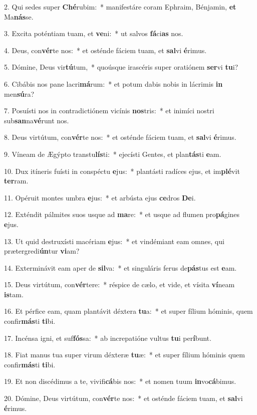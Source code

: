 2. Qui sedes super \textbf{Ché}rubim:~*  manifestáre coram Ephraim, Bénjamin, \textbf{et} Ma\textbf{nás}se.\

3. Excita poténtiam tuam, et \textbf{ve}ni:~*  ut salvos \textbf{fá}ci\textbf{as} nos.\

4. Deus, con\textbf{vér}te nos:~*  et osténde fáciem tuam, et \textbf{sal}vi \textbf{é}rimus.\

5. Dómine, Deus vir\textbf{tú}tum,~*  quoúsque irascéris super oratiónem \textbf{ser}vi \textbf{tu}i?\

6. Cibábis nos pane lacri\textbf{má}rum:~*  et potum dabis nobis in lácrimis \textbf{in} men\textbf{sú}ra?\

7. Posuísti nos in contradictiónem vicínis \textbf{nos}tris:~*  et inimíci nostri sub\textbf{san}na\textbf{vé}runt nos.\

8. Deus virtútum, con\textbf{vér}te nos:~*  et osténde fáciem tuam, et \textbf{sal}vi \textbf{é}rimus.\

9. Víneam de Ægýpto transtu\textbf{lís}ti:~*  ejecísti Gentes, et plan\textbf{tás}ti \textbf{e}am.\

10. Dux itíneris fuísti in conspéctu \textbf{e}jus:~*  plantásti radíces ejus, et im\textbf{plé}vit \textbf{ter}ram.\

11. Opéruit montes umbra \textbf{e}jus:~*  et arbústa ejus \textbf{ce}dros \textbf{De}i.\

12. Exténdit pálmites suos usque ad \textbf{ma}re:~*  et usque ad flumen pro\textbf{pá}gines \textbf{e}jus.\

13. Ut quid destruxísti macériam \textbf{e}jus:~*  et vindémiant eam omnes, qui prætergredi\textbf{ún}tur \textbf{vi}am?\

14. Exterminávit eam aper de \textbf{sil}va:~*  et singuláris ferus de\textbf{pás}tus est \textbf{e}am.\

15. Deus virtútum, con\textbf{vér}tere:~*  réspice de cælo, et vide, et vísita \textbf{ví}neam \textbf{is}tam.\

16. Et pérfice eam, quam plantávit déxtera \textbf{tu}a:~*  et super fílium hóminis, quem confir\textbf{más}ti \textbf{ti}bi.\

17. Incénsa igni, et suf\textbf{fós}sa:~*  ab increpatióne vultus \textbf{tu}i per\textbf{í}bunt.\

18. Fiat manus tua super virum déxteræ \textbf{tu}æ:~*  et super fílium hóminis quem confir\textbf{más}ti \textbf{ti}bi.\

19. Et non discédimus a te, vivifi\textbf{cá}bis nos:~*  et nomen tuum \textbf{in}vo\textbf{cá}bimus.\

20. Dómine, Deus virtútum, con\textbf{vér}te nos:~*  et osténde fáciem tuam, et \textbf{sal}vi \textbf{é}rimus.\


